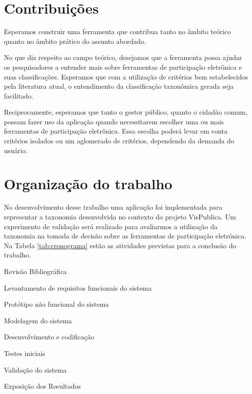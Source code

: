 \section{Contribuições}
\label{sec:contribuicoes}
Esperamos construir uma ferramenta que contribua tanto no âmbito teórico quanto no âmbito prático do assunto abordado. 
\par
No que diz respeito ao campo teórico, desejamos que a ferramenta possa ajudar os pesquisadores a entender mais sobre ferramentas de participação eletrônica e suas classificações. 
Esperamos que com a utilização de critérios bem estabelecidos pela literatura atual, o entendimento da classificação taxonômica gerada seja facilitado.
\par
Reciprocamente, esperamos que tanto o gestor público, quanto o cidadão comum, possam fazer uso da aplicação quando necessitarem escolher uma ou mais ferramentas de participação
eletrônica. Essa escolha poderá levar em conta critérios isolados ou um aglomerado de critérios, dependendo da demanda do usuário.



\section{Organização do trabalho}
\label{sec:organizacao}
No desenvolvimento desse trabalho uma aplicação foi implementada para representar a taxonomia desenvolvida no contexto do projeto VisPublica.
Um experimento de validação será realizado para avaliarmos a utilização da taxonomia na tomada de decisão sobre as ferramentas de participação eletrônica.
Na Tabela \ref{tab:cronograma} estão as atividades previstas para a conclusão do trabalho.
\begin{enumerate}
    \begin{singlespace}
    \fontsize{10}{12}\selectfont 
    \item\label{revisao}Revisão Bibliográfica
    \item\label{requisitos} Levantamento de requisitos funcionais do sistema
    \item\label{prototipo} Protótipo não funcional do sistema
    \item\label{modelagem} Modelagem do sistema
    \item\label{dev} Desenvolvimento e codificação
    \item\label{teste} Testes iniciais
    \item\label{validacao} Validação do sistema
    \item\label{expo} Exposição dos Resultados
    \end{singlespace}
\end{enumerate}

